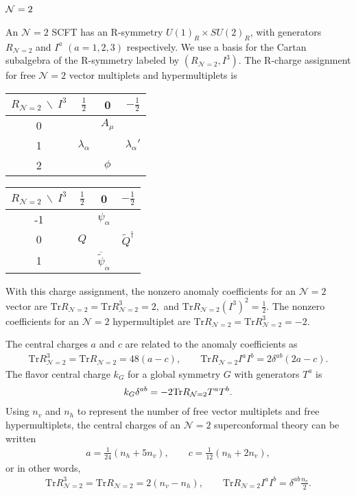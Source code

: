 \documentclass[a4paper,11pt]{article}
\newcommand{\ba}[1]{\begin{align} #1 \end{align} }
\def\tr{\text{Tr}}
\def\CN{{\cal N}}
\newcommand{\mc}[1]{\mathcal{ #1} }
\begin{document}
\subsection{$\CN=2$}%

An $\mc{N}=2$ SCFT has an R-symmetry $U(1)_R\times SU(2)_R$, with generators $R_{\mc{N}=2}$ and $I^a$ $(a=1,2,3)$ respectively. We use a basis for the Cartan subalgebra of the R-symmetry labeled by $(R_{\mc{N}=2},I^3)$. The R-charge assignment for free $\mc{N}=2$ vector multiplets and hypermultiplets is 
	\begin{table}[h!]
	\centering
	\begin{tabular}{c|ccc}
{$R_{\mc{N}=2}\ \backslash\  I^3$}
 & $\frac{1}{2}$ & 0 & $-\frac{1}{2}$ \\ \hline
	 0	& & $A_\mu$ & \\
	 1 	& $\lambda_\alpha$ & & $ \lambda_\alpha'$ \\
	 2 	& & $\phi$ & 
	\end{tabular} \qquad
	\begin{tabular}{c|ccc}
{$R_{\mc{N}=2}\ \backslash\  I^3$} 
 & $\frac{1}{2}$ & 0 & $-\frac{1}{2}$ \\ \hline
	 -1	& & $\psi_\alpha$ & \\
	 0 	& $Q$ & & $ \widetilde{Q}^\dagger$ \\
	 1 	& & $\overline{\widetilde{\psi}}_{\dot{\alpha}}$ & 
	\end{tabular}
	\end{table} 
	
With this charge assignment, the nonzero anomaly coefficients for an $\mc{N}=2$ vector are $\tr R_{\mc{N}=2}=\tr R_{\mc{N}=2}^3=2,$ and $\tr R_{\mc{N}=2} (I^3)^2 = \frac{1}{2}$. The nonzero coefficients for an $\mc{N}=2$ hypermultiplet are $\tr R_{\mc{N}=2}= \tr R_{\mc{N}=2}^3=-2$.

The central charges $a$ and $c$ are related to the anomaly coefficients as \cite{Kuzenko:1999pi}
	\ba{
	\tr R_{\mc{N}=2}^3 = \tr R_{\mc{N}=2} = 48(a-c),\qquad \tr R_{\mc{N}=2} I^aI^b=2\delta^{ab}(2a-c).
	}
The flavor central charge $k_G$ for a global symmetry $G$ with generators $T^a$ is
	\ba{
	k_G \delta^{ab}=-2\tr R_{\CN=2} T^aT^b.\label{eq:n2kcoef}
	}
Using $n_v$ and $n_h$ to represent the number of free vector multiplets and free hypermultiplets, the central charges of an $\mc{N}=2$ superconformal theory can be written
	\ba{
	a = \frac{1}{24} \left( n_h + 5 n_v\right),\qquad c = \frac{1}{12} \left( n_h + 2 n_v\right), \label{eq:charges}
	}
or in other words,
	\ba{
	\tr R_{\mc{N}=2}^3 = \tr R_{\mc{N}=2} = 2(n_v-n_h),\qquad \tr R_{\mc{N}=2} I^aI^b=\delta^{ab}\frac{n_v}{2}.\label{eq:n2coef}
	}
	
\end{document}

